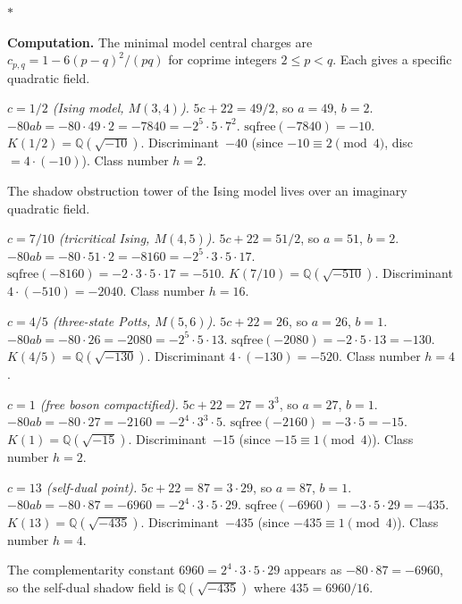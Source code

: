\documentclass[11pt]{article}
\newcommand{\Q}{\mathbb{Q}}
\newcommand{\sep}{\bigskip\begin{center}$*$\end{center}\medskip}
\begin{document}
\sep

\noindent\textbf{Computation.}\enspace
The minimal model central charges are
$c_{p,q} = 1 - 6(p-q)^2/(pq)$ for coprime integers
$2 \leq p < q$.  Each gives a specific quadratic field.

\medskip

\noindent\textit{$c = 1/2$ (Ising model, $M(3,4)$).}\enspace
$5c + 22 = 49/2$, so $a = 49$, $b = 2$.
$-80ab = -80 \cdot 49 \cdot 2 = -7840 = -2^5 \cdot 5 \cdot 7^2$.
$\mathrm{sqfree}(-7840) = -10$.
$K(1/2) = \Q(\sqrt{-10})$.
Discriminant~$-40$ (since $-10 \equiv 2 \pmod{4}$,
disc $= 4 \cdot (-10)$).  Class number $h = 2$.

The shadow obstruction tower of the Ising model lives over an imaginary
quadratic field.

\medskip

\noindent\textit{$c = 7/10$ (tricritical Ising, $M(4,5)$).}\enspace
$5c + 22 = 51/2$, so $a = 51$, $b = 2$.
$-80ab = -80 \cdot 51 \cdot 2 = -8160 = -2^5 \cdot 3 \cdot 5 \cdot 17$.
$\mathrm{sqfree}(-8160) = -2 \cdot 3 \cdot 5 \cdot 17 = -510$.
$K(7/10) = \Q(\sqrt{-510})$.
Discriminant $4 \cdot (-510) = -2040$.
Class number $h = 16$.

\medskip

\noindent\textit{$c = 4/5$ (three-state Potts, $M(5,6)$).}\enspace
$5c + 22 = 26$, so $a = 26$, $b = 1$.
$-80ab = -80 \cdot 26 = -2080 = -2^5 \cdot 5 \cdot 13$.
$\mathrm{sqfree}(-2080) = -2 \cdot 5 \cdot 13 = -130$.
$K(4/5) = \Q(\sqrt{-130})$.
Discriminant $4 \cdot (-130) = -520$.
Class number $h = 4$.

\medskip

\noindent\textit{$c = 1$ (free boson compactified).}\enspace
$5c + 22 = 27 = 3^3$, so $a = 27$, $b = 1$.
$-80ab = -80 \cdot 27 = -2160 = -2^4 \cdot 3^3 \cdot 5$.
$\mathrm{sqfree}(-2160) = -3 \cdot 5 = -15$.
$K(1) = \Q(\sqrt{-15})$.
Discriminant~$-15$ (since $-15 \equiv 1 \pmod{4}$).
Class number $h = 2$.

\medskip

\noindent\textit{$c = 13$ (self-dual point).}\enspace
$5c + 22 = 87 = 3 \cdot 29$, so $a = 87$, $b = 1$.
$-80ab = -80 \cdot 87 = -6960 = -2^4 \cdot 3 \cdot 5 \cdot 29$.
$\mathrm{sqfree}(-6960) = -3 \cdot 5 \cdot 29 = -435$.
$K(13) = \Q(\sqrt{-435})$.
Discriminant~$-435$ (since $-435 \equiv 1 \pmod{4}$).
Class number $h = 4$.

The complementarity constant
$6960 = 2^4 \cdot 3 \cdot 5 \cdot 29$ appears as
$-80 \cdot 87 = -6960$, so the self-dual shadow field is
$\Q(\sqrt{-435})$ where $435 = 6960/16$.
\end{document}
